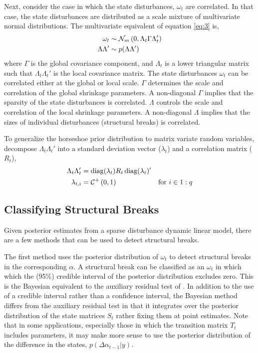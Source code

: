 \documentclass{article}
\begin{document}
Next, consider the case in which the state disturbances, $\omega_{t}$ are correlated.
In that case, the state disturbances are distributed as a scale mixture of multivariate normal distributions.
The multivariate equivalent of equation \eqref{eq:3} is,
\begin{equation}
  \begin{aligned}[t]
    \omega_{t} &\sim \dmvnorm{0, \Lambda_{t} \Gamma \Lambda_{t}'}{m} \\
    \Lambda \Lambda' & \sim p(\Lambda \Lambda')
  \end{aligned}
\end{equation}
where $\Gamma$ is the global covariance component, and $\Lambda_{t}$ is a lower triangular matrix such that  $\Lambda_{t} \Lambda_{t}'$ is the local covariance matrix.
The state disturbances $\omega_{t}$ can be correlated either at the global or local scale.
$\Gamma$ determines the scale and correlation of the global shrinkage parameters.
A non-diagonal $\Gamma$ implies that the sparsity of the state disturbances is correlated.
$\Lambda$ controls the scale and correlation of the local shrinkage parameters.
A non-diagonal $\Lambda$ implies that the sizes of individual disturbances (structural breaks) is correlated.

To generalize the horseshoe prior distribution to matrix variate random variables, decompose $\Lambda_{t} \Lambda_{t}'$ into a standard deviation vector ($\lambda_{t}$) and a correlation matrix ($R_{t}$),%
\begin{align}
  \label{eq:16}
  \Lambda_{t} \Lambda_{t}' &= \diag(\lambda_{t}) R_{t} \diag(\lambda_{t})' \\
  \label{eq:17}
  \lambda_{t,i} &= \dhalfcauchy{0, 1} & \text{for $i \in 1:q$}
\end{align}


\subsection{Classifying Structural Breaks}
\label{sec:structural-breaks}

Given posterior estimates from a sparse disturbance dynamic linear model, there are a few methods that can be used to detect structural breaks.

The first method uses the posterior distribution of $\omega_{t}$ to detect structural breaks in the corresponding $\alpha$.
A structural break can be classified as an $\omega_{t}$ in which which the (95\%) credible interval of the posterior distribution excludes zero.
This is the Bayesian equivalent to the auxiliary residual test of \textcites{JongPenzer1998}{DurbinKoopman2001}.%
In addition to the use of a credible interval rather than a confidence interval, the Bayesian method differs from the auxiliary residual test in that it integrates over the posterior distribution of the state matrices $S_{t}$ rather fixing them at point estimates.
Note that in some applications, especially those in which the transition matrix $T_{t}$ includes parameters, it may make more sense to use the posterior distribution of the difference in the states, $p(\Delta \alpha_{t - 1} | y)$.
\end{document}
